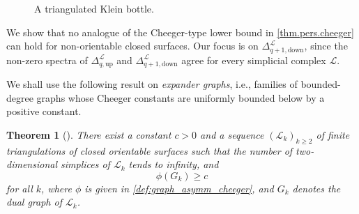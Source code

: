 \documentclass{article}
\newtheorem{theorem}{Theorem}[section]
\newcommand{\LL}{\mathcal{L}}
\begin{document}
\begin{figure}
\centering
{}
\caption{A triangulated Klein bottle.}
\label{fig:klein}
\end{figure}

\label{sec.klein.failure}
We show that no analogue of the Cheeger-type lower bound in \cref{thm.pers.cheeger} can hold for non-orientable closed surfaces. Our focus is on \(\Delta_{q+1,\mathrm{down}}^\LL\), since the
non-zero spectra of \(\Delta_{q,\mathrm{up}}^\LL\) and
\(\Delta_{q+1,\mathrm{down}}^\LL\) agree for every simplicial complex
\(\LL\).

We shall use the following result on \emph{expander graphs}, i.e., families
of bounded-degree graphs whose Cheeger constants are uniformly bounded
below by a positive constant.

\begin{theorem}[\cite{ivrissimtzis2019trivalent}]
There exist a constant \(c>0\) and a sequence \((\LL_k)_{k\geq 2}\) of
finite triangulations of closed orientable surfaces such that the number
of two-dimensional simplices of \(\LL_k\) tends to infinity, and
\[
    \phi(G_k) \geq c
\]
for all \(k\), where \(\phi\) is given in
\cref{def:graph_asymm_cheeger}, and \(G_k\) denotes the dual graph of \(\LL_k\).
\label{thm.dualgraph.expander}
\end{theorem}
\end{document}
